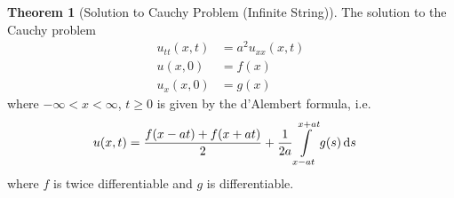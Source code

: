 \documentclass[titlepage, fleqn, a4paper, 12pt, twoside]{article}
\theoremstyle{definition}
\theoremstyle{theorem}
\newtheorem{theorem}{Theorem}
\begin{document}
\begin{theorem}[Solution to Cauchy Problem (Infinite String)]
	The solution to the Cauchy problem
	\begin{align*}
		u_{t t}(x,t) & = a^2 u_{x x}(x,t) \\
		u(x,0)       & = f(x)             \\
		u_x(x,0)     & = g(x)
	\end{align*}
	where $-\infty < x < \infty$, $t \ge 0$ is given by the d'Alembert formula, i.e.
	\begin{align*}
		u(x,t) & = \frac{f(x - a t) + f(x + a t)}{2} + \frac{1}{2 a} \int\limits_{x - a t}^{x + a t} g(s) \dif s
	\end{align*}
	where $f$ is twice differentiable and $g$ is differentiable.
	\label{thm:Solution_to_Cauchy_Problem}
\end{theorem}
\end{document}
